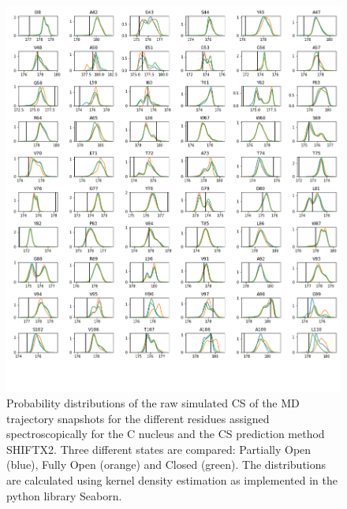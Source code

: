 \documentclass[%
 aip,
 amsmath,amssymb,
 preprint,%
]{revtex4-1}
\begin{document}
\begin{figure}[tbp]
	\includegraphics[width=\textwidth]{figures_SI/hist_shiftx2_C.png}
	 \caption{\scriptsize
 Probability distributions of the raw simulated CS of the MD trajectory snapshots for the different residues assigned spectroscopically for the C nucleus and the CS prediction method SHIFTX2. Three different states are compared: Partially Open (blue), Fully Open (orange) and Closed (green). The distributions are calculated using kernel density estimation as implemented in the python library Seaborn. 
}
\label{SI_hist3}
\end{figure}
\end{document}
